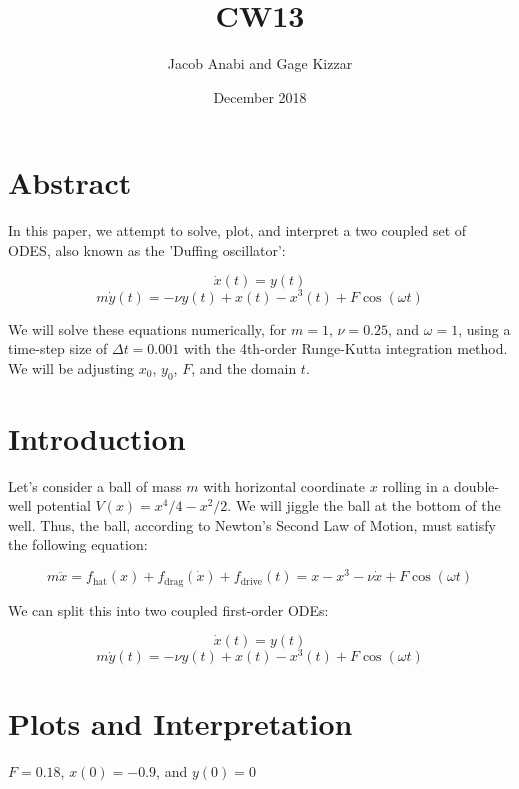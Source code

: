\documentclass{article}
\title{CW13}
\author{Jacob Anabi and Gage Kizzar }
\date{December 2018}
\begin{document}
\maketitle

\section{Abstract}
In this paper, we attempt to solve, plot, and interpret a two coupled set of ODES, also known as the 'Duffing oscillator':

$$\dot{x}(t) = y(t)$$
$$m\dot{y}(t) = -\nu y(t) + x(t) - x^3(t) + F\cos(\omega t)$$

We will solve these equations numerically, for $m=1$, $\nu = 0.25$, and $\omega = 1$, using a time-step size of $\Delta t = 0.001$ with the 4th-order Runge-Kutta integration method. We will be adjusting $x_0$, $y_0$, $F$, and the domain $t$.

\section{Introduction}
Let's consider a ball of mass $m$ with horizontal coordinate $x$ rolling in a double-well potential $V(x) = x^4/4 - x^2/2$. We will jiggle the ball at the bottom of the well. Thus, the ball, according to Newton's Second Law of Motion, must satisfy the following equation:

$$m\ddot{x} = f_{\text{hat}}(x) + f_{\text{drag}}(\dot{x}) + f_{\text{drive}}(t) = x - x^3 - \nu \dot{x} + F\cos(\omega t)$$

We can split this into two coupled first-order ODEs:

$$\dot{x}(t) = y(t)$$
$$m\dot{y}(t) = -\nu y(t) + x(t) - x^3(t) + F\cos(\omega t)$$

\section{Plots and Interpretation}

$F=0.18$, $x(0)=-0.9$, and $y(0)=0$
\end{document}

